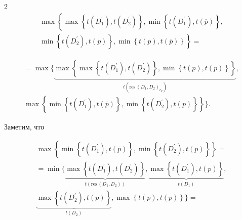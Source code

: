 \begin{multicols}{2}
\begin{multline*}
    \max\left\{ \max\left\{ t(D_1^\prime), t(D_2^\prime)\right\}, \min\left\{ 


t(D_1^\prime), t(\overline{p})\right\},\right.\\


\left.


  \min\left\{ t(D_2^\prime), t(p)\right\}, \min \left\{ t(p), 


t(\overline{p})\right\}\right\}={}


\end{multline*}





\noindent  


\begin{multline*}


    =\!


  \max\!\Bigg\{\!


  \underbrace{\max\!\left\{ \max\left\{ t(D_1^\prime), t(D_2^\prime)\right\}\!, 


\min\left\{ t(p), t(\overline{p})\right\}\!\right\}}_{t(\mathrm{res}\,(D_1,D_2)_{c_p})}, \\[2pt]


\max\left\{ \min \left\{ t(D_1^\prime), t(\overline{p})\right\}, \min\left\{ 


t(D_2^\prime), t(p)\right\}\right\}\Bigg\}.


  \end{multline*}


  


  Заметим, что


  \begin{multline*}


\max\left\{\min \left\{ t\left(D_1^\prime\right), t\left(\overline{p}\right)\right\}, \min \left\{ t\left( D_2^\prime\right), t(p)\right\}\right\}={}\\[2pt]


{}=  


  \min\Bigg\{ 


  \underbrace{\max\left\{ t(D_1^\prime), t(D_2^\prime)\right\}}_{t(\mathrm{res}\,(D_1,D_2))}, 


\underbrace{\max\left\{ t(D_1^\prime), t(p)\right\}}_{t(D_1)},\\[2pt] 


\underbrace{\max\left\{ t(D_2^\prime), t(\overline{p})\right\}}_{t(D_2)}, 


\max\left\{ t(p), t(\overline{p})\right\}\Bigg\}={}\\[2pt]



\end{multline*}
\end{multicols}
